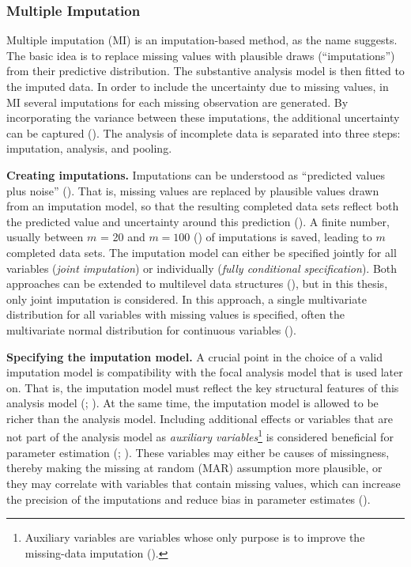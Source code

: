 \documentclass[
  letterpaper,
  11pt,
  english,
  singlespacing,
  headsepline,
  openany]{MastersDoctoralThesis}
\begin{document}
\subsubsection{Multiple Imputation}\label{multiple-imputation}

Multiple imputation (MI) is an imputation-based method, as the name
suggests. The basic idea is to replace missing values with plausible
draws (``imputations'') from their predictive distribution. The
substantive analysis model is then fitted to the imputed data. In order
to include the uncertainty due to missing values, in MI several
imputations for each missing observation are generated. By incorporating
the variance between these imputations, the additional uncertainty can
be captured (). The
analysis of incomplete data is separated into three steps: imputation,
analysis, and pooling.

\textbf{Creating imputations.} Imputations can be understood as
``predicted values plus noise'' (). That is, missing values are replaced by plausible values drawn
from an imputation model, so that the resulting completed data sets
reflect both the predicted value and uncertainty around this prediction
(). A finite number, usually between
\(m\) = 20 and \(m = 100\) () of imputations is saved, leading to \(m\) completed data sets.
The imputation model can either be specified jointly for all variables
(\emph{joint imputation}) or individually (\emph{fully conditional
specification}). Both approaches can be extended to multilevel data
structures (), but in this
thesis, only joint imputation is considered. In this approach, a single
multivariate distribution for all variables with missing values is
specified, often the multivariate normal distribution for continuous
variables ().

\textbf{Specifying the imputation model.} A crucial point in the choice
of a valid imputation model is compatibility with the focal analysis
model that is used later on. That is, the imputation model must reflect
the key structural features of this analysis model
(;
). At the same time, the imputation model
is allowed to be richer than the analysis model. Including additional
effects or variables that are not part of the analysis model as
\emph{auxiliary variables}\footnote{Auxiliary variables are variables
  whose only purpose is to improve the missing-data imputation
  ().} is considered
beneficial for parameter estimation (; ). These variables
may either be causes of missingness, thereby making the missing at
random (MAR) assumption more plausible, or they may correlate with
variables that contain missing values, which can increase the precision
of the imputations and reduce bias in parameter estimates
().
\end{document}
